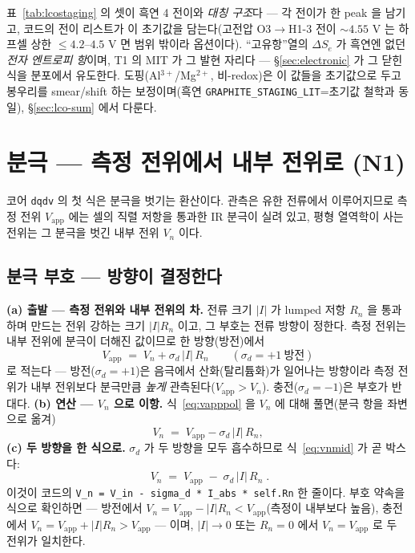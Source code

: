\documentclass[11pt,a4paper]{article}
\newcommand{\app}{\mathrm{app}}
\newcommand{\code}[1]{\texttt{#1}}
\begin{document}
표~\ref{tab:lcostaging} 의 셋이 흑연 4 전이와 \emph{대칭 구조}다 — 각 전이가 한 peak 을 남기고, 코드의 전이 리스트가
이 초기값을 담는다(고전압 O3$\to$H1-3 전이 $\sim4.55$ V 는 하프셀 상한 $\le4.2$--$4.5$ V 면 범위 밖이라 옵션이다).
``고유항''열의 $\Delta S_e$ 가 흑연엔 없던 \emph{전자 엔트로피 항}이며, T1 의 MIT 가 그 발현 자리다 —
\S\ref{sec:electronic} 가 그 닫힌식을 분포에서 유도한다. 도핑(Al$^{3+}$/Mg$^{2+}$, 비-redox)은 이 값들을 초기값으로
두고 봉우리를 smear/shift 하는 보정이며(흑연 \code{GRAPHITE\_STAGING\_LIT}=초기값 철학과 동일), \S\ref{sec:lco-sum}
에서 다룬다.

\section{분극 — 측정 전위에서 내부 전위로 (N1)}\label{sec:pol}
코어 \code{dqdv} 의 첫 식은 분극을 벗기는 환산이다. 관측은 유한 전류에서 이루어지므로 측정 전위 $V_\app$ 에는 셀의
직렬 저항을 통과한 IR 분극이 실려 있고, 평형 열역학이 사는 전위는 그 분극을 벗긴 내부 전위 $V_n$ 이다.

\subsection{분극 부호 — 방향이 결정한다}
\textbf{(a) 출발 — 측정 전위와 내부 전위의 차.} 전류 크기 $|I|$ 가 lumped 저항 $R_n$ 을 통과하며 만드는 전위 강하는
크기 $|I|R_n$ 이고, 그 부호는 전류 방향이 정한다. 측정 전위는 내부 전위에 분극이 더해진 값이므로 한 방향(방전)에서
\begin{equation}
V_\app\;=\;V_n+\sigma_d\,|I|\,R_n
\qquad(\sigma_d=+1\ \text{방전})
\label{eq:vapppol}
\end{equation}
로 적는다 — 방전($\sigma_d=+1$)은 음극에서 산화(탈리튬화)가 일어나는 방향이라 측정 전위가 내부 전위보다 분극만큼
\emph{높게} 관측된다($V_\app>V_n$). 충전($\sigma_d=-1$)은 부호가 반대다. \textbf{(b) 연산 — $V_n$ 으로 이항.}
식~\eqref{eq:vapppol} 을 $V_n$ 에 대해 풀면(분극 항을 좌변으로 옮겨)
\begin{equation}
V_n\;=\;V_\app-\sigma_d\,|I|\,R_n,
\label{eq:vnmid}
\end{equation}
\textbf{(c) 두 방향을 한 식으로.} $\sigma_d$ 가 두 방향을 모두 흡수하므로 식~\eqref{eq:vnmid} 가 곧 박스다:
\begin{equation}
\boxed{\;V_n\;=\;V_\app\;-\;\sigma_d\,|I|\,R_n\;.}
\label{eq:vn}
\end{equation}
이것이 코드의 \code{V\_n = V\_in - sigma\_d * I\_abs * self.Rn} 한 줄이다. 부호 약속을 식으로 확인하면 —
방전에서 $V_n=V_\app-|I|R_n<V_\app$(측정이 내부보다 높음), 충전에서 $V_n=V_\app+|I|R_n>V_\app$ — 이며,
$|I|\to0$ 또는 $R_n=0$ 에서 $V_n=V_\app$ 로 두 전위가 일치한다.
\end{document}
